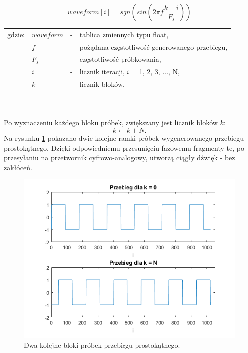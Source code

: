 \begin{equation} \label{equ:sub_1}
waveform[i]=sgn(sin(2\pi f\frac{k+i}{F_s}))
\end{equation}
\begin{tabular}{ l l l l}
	gdzie: & $waveform$ &  - & tablica zmiennych typu float, \\
	&	$f$ & - &  pożądana częstotliwość generowanego przebiegu, \\
	&	$F_s$ & - & częstotliwość próbkowania,\\
	&	$i$ & - &  licznik iteracji, $i$ = 1, 2, 3, ..., N,\\
	&	$k$ & - &  licznik bloków.\\
\end{tabular} \\ \\
Po wyznaczeniu każdego bloku próbek, zwiększany jest licznik bloków $k$:
\begin{equation} \label{equ:sub_2}
k \gets k + N.
\end{equation}
Na rysunku \ref{rys:sub_waveform_blocks} pokazano dwie kolejne ramki próbek wygenerowanego przebiegu prostokątnego. Dzięki odpowiedniemu przesunięciu fazowemu fragmenty te, po przesyłaniu na przetwornik cyfrowo-analogowy, utworzą ciągły dźwięk - bez zakłóceń.
\begin{figure}[H]
	\centering
	\includegraphics[width=12cm]{grafiki/sub_waveform_blocks}
	\captionsetup{justification=centering}
	\caption{Dwa kolejne bloki próbek przebiegu prostokątnego.}
	\label{rys:sub_waveform_blocks}
\end{figure}

